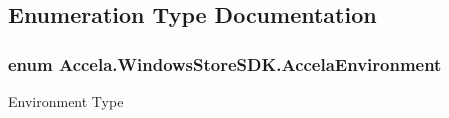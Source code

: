 \subsection{Enumeration Type Documentation}
\hypertarget{namespace_accela_1_1_windows_store_s_d_k_a47577e6208bf1ae5cf34c33d54a3458c}{
\subsubsection[{Accela\+Environment}]{\setlength{\rightskip}{0pt plus 5cm}enum {\bf Accela.\+Windows\+Store\+S\+D\+K.\+Accela\+Environment}}}\label{namespace_accela_1_1_windows_store_s_d_k_a47577e6208bf1ae5cf34c33d54a3458c}


Environment Type 

